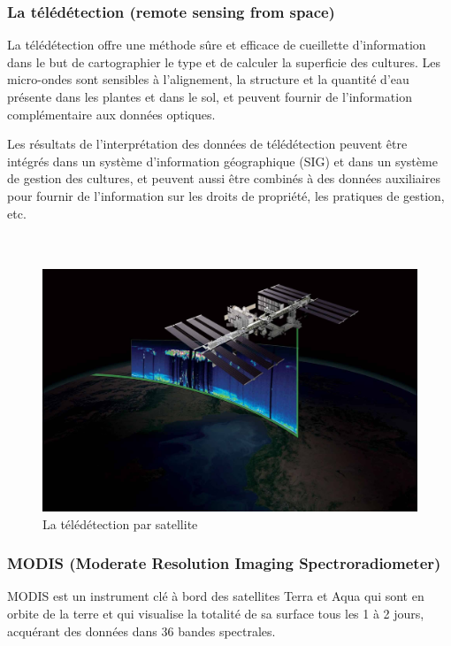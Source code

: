 \documentclass[12pt, openany]{report}
\begin{document}
\subsubsection{La télédétection (remote sensing from space)}
La télédétection offre une méthode sûre et efficace de cueillette d'information dans le but de cartographier le type et de calculer la superficie des cultures.
Les micro-ondes sont sensibles à l'alignement, la structure et la quantité d'eau présente dans les plantes et dans le sol, et peuvent fournir de l'information complémentaire aux données optiques. 

\par
Les résultats de l'interprétation des données de télédétection peuvent être intégrés dans un système d'information géographique (SIG) et dans un système de gestion des cultures, et peuvent aussi être combinés à des données auxiliaires pour fournir de l'information sur les droits de propriété, les pratiques de gestion, etc. \cite{cropmapp}\\ \\ \\

\begin{figure}[h]
\centering
\includegraphics[scale=0.2]{tele.jpg}
\caption{La télédétection par satellite}
\end{figure}

\subsubsection{MODIS (Moderate Resolution Imaging Spectroradiometer)}
MODIS est un instrument clé à bord des satellites Terra et Aqua qui sont en orbite de la terre et qui visualise la totalité de sa surface tous les 1 à 2 jours, acquérant des données dans 36 bandes spectrales.
\end{document}
